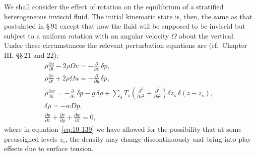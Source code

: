We shall consider the effect of rotation on the equilibrium of a stratified heterogeneous inviscid fluid. The initial kinematic state is, then, the same as that postulated in \S\,91 except that now the fluid will be supposed to be inviscid but subject to a uniform rotation with an angular velocity $\Omega$ about the vertical. Under these circumstances the relevant perturbation equations are (cf.\ Chapter III, \S\S\,21 and 22):
\begin{gather}
\rho\frac{\partial u}{\partial t} - 2\rho\Omega v = -\frac{\partial}{\partial x}\,\delta p, \label{eq:10-137}\\
\rho\frac{\partial v}{\partial t} + 2\rho\Omega u = -\frac{\partial}{\partial y}\,\delta p, \label{eq:10-138}\\
\rho\frac{\partial w}{\partial t} = -\frac{\partial}{\partial z}\,\delta p - g\,\delta\rho + \sum_s T_s\!\left(\frac{\partial^2}{\partial x^2}+\frac{\partial^2}{\partial y^2}\right)\!\delta z_s\,\delta(z-z_s), \label{eq:10-139}\\
\delta\rho = -wDp, \label{eq:10-140}\\
\frac{\partial u}{\partial x}+\frac{\partial v}{\partial y}+\frac{\partial w}{\partial z} = 0, \label{eq:10-141}
\end{gather}
where in equation~\eqref{eq:10-139} we have allowed for the possibility that at some preassigned levels $z_s$, the density may change discontinuously and bring into play effects due to surface tension.

